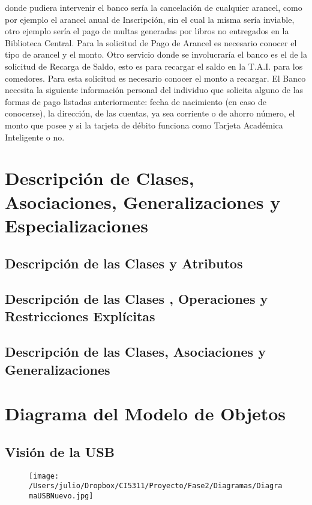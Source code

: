 \documentclass[12pt,a4paper,spanish]{article}
\begin{document}
donde pudiera intervenir el banco ser\'ia la cancelaci\'on de
cualquier arancel, como por ejemplo el arancel anual de Inscripci\'on,
sin el cual la misma ser\'ia inviable, otro ejemplo ser\'ia el pago de
multas generadas por libros no entregados en la Biblioteca
Central. Para la solicitud de Pago de Arancel es necesario conocer el
tipo de arancel y el monto. Otro servicio donde se involucrar\'ia el
banco es el de la solicitud de Recarga de Saldo, esto es para recargar
el saldo en la T.A.I. para los comedores. Para esta solicitud es
necesario conocer el monto a recargar.
\newline
\newline
El Banco necesita la siguiente informaci\'on personal del individuo que solicita alguno de las
formas de pago listadas anteriormente: fecha de nacimiento (en caso de
conocerse), la direcci\'on, de las cuentas, ya sea corriente o de ahorro n\'umero, el
monto que posee y si la tarjeta de d\'ebito funciona como Tarjeta Acad\'emica Inteligente o no.


\newpage
\section{Descripci\'on de Clases, Asociaciones, Generalizaciones y
  Especializaciones}
\subsection{Descripci\'on de las Clases y Atributos}

\subsection{Descripci\'on de las Clases , Operaciones y
  Restricciones Expl\'icitas}

\subsection{Descripci\'on de las Clases, Asociaciones y
  Generalizaciones}


\section{Diagrama del Modelo de Objetos}
\subsection{Visi\'on de la USB}
\begin{landscape}
\begin{figure}
    \texttt{[image: /Users/julio/Dropbox/CI5311/Proyecto/Fase2/Diagramas/DiagramaUSBNuevo.jpg]}
\end{figure} 
\end{landscape}
\end{document}
